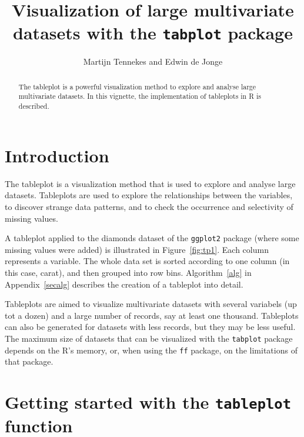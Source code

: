 \documentclass[11pt, fleqn, a4paper]{article}
\title{Visualization of large multivariate datasets with the {\tt tabplot} package}
\author{Martijn Tennekes and Edwin de Jonge}
\begin{document}

\maketitle
\begin{abstract}

The tableplot is a powerful visualization method to explore and analyse large multivariate datasets. In this vignette, the implementation of tableplots in R is described. 


\end{abstract}

\maketitle


\section{Introduction}
The tableplot is a visualization method that is used to explore and analyse large datasets. Tableplots are used to explore the relationships between the variables, to discover strange data patterns, and to check the occurrence and selectivity of missing values. 

A tableplot applied to the diamonds dataset of the {\tt ggplot2} package (where some missing values were added) is illustrated in Figure~\ref{fig:tp1}. Each column represents a variable. The whole data set is sorted according to one column (in this case, carat), and then grouped into row bins. Algorithm~\ref{alg} in Appendix~\ref{secalg} describes the creation of a tableplot into detail.

Tableplots are aimed to visualize multivariate datasets with several variabels (up tot a dozen) and a large number of records, say at least one thousand. Tableplots can also be generated for datasets with less records, but they may be less useful. The maximum size of datasets that can be visualized with the {\tt tabplot} package depends on the R's memory, or, when using the {\tt ff} package, on the limitations of that package.

\section{Getting started with the {\tt tableplot} function}
\end{document}

